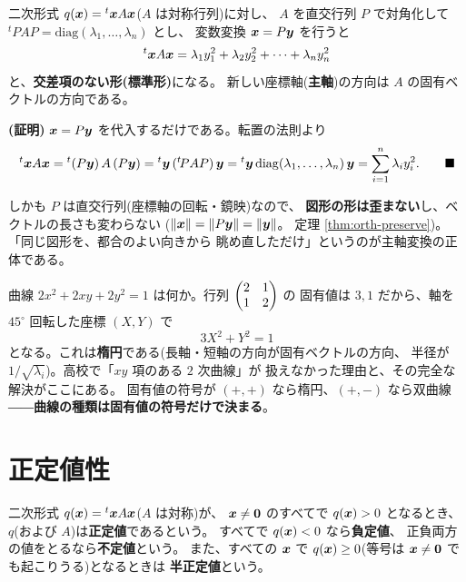 \begin{teiri}\label{thm:quad-std}
二次形式 $q(\bm{x}) = {}^t\bm{x}A\bm{x}$($A$ は対称行列)に対し、
$A$ を直交行列 $P$ で対角化して
${}^t\!PAP = \mathrm{diag}(\lambda_1, \dots, \lambda_n)$ とし、
変数変換 $\bm{x} = P\bm{y}$ を行うと
\[
{}^t\bm{x}A\bm{x}
= \lambda_1 y_1^2 + \lambda_2 y_2^2 + \cdots + \lambda_n y_n^2
\]
と、\textbf{交差項のない形(標準形)}になる。
新しい座標軸(\textbf{主軸})の方向は $A$ の固有ベクトルの方向である。
\end{teiri}

\noindent\textbf{(証明)}\quad
$\bm{x} = P\bm{y}$ を代入するだけである。転置の法則より
\[
{}^t\bm{x}A\bm{x} = {}^t(P\bm{y})\,A\,(P\bm{y})
= {}^t\bm{y}\,({}^t\!PAP)\,\bm{y}
= {}^t\bm{y}\,\mathrm{diag}(\lambda_1, \dots, \lambda_n)\,\bm{y}
= \sum_{i=1}^{n} \lambda_i y_i^2. \qquad\blacksquare
\]

しかも $P$ は直交行列(座標軸の回転・鏡映)なので、
\textbf{図形の形は歪まない}し、ベクトルの長さも変わらない
($\|\bm{x}\| = \|P\bm{y}\| = \|\bm{y}\|$。
定理 \ref{thm:orth-preserve})。「同じ図形を、都合のよい向きから
眺め直しただけ」というのが主軸変換の正体である。

\begin{rei}[二次曲線の分類]\label{rei:quad-conic}
曲線 $2x^2 + 2xy + 2y^2 = 1$ は何か。行列 $\begin{pmatrix}2 & 1 \\ 1 & 2\end{pmatrix}$ の
固有値は $3, 1$ だから、軸を $45^\circ$ 回転した座標 $(X, Y)$ で
\[
3X^2 + Y^2 = 1
\]
となる。これは\textbf{楕円}である(長軸・短軸の方向が固有ベクトルの方向、
半径が $1/\sqrt{\lambda_i}$)。高校で「$xy$ 項のある $2$ 次曲線」が
扱えなかった理由と、その完全な解決がここにある。
固有値の符号が $(+, +)$ なら楕円、$(+, -)$ なら双曲線
――\textbf{曲線の種類は固有値の符号だけで決まる}。
\end{rei}

\section{正定値性}

\begin{teigi}[正定値]\label{def:quad-posdef}
二次形式 $q(\bm{x}) = {}^t\bm{x}A\bm{x}$($A$ は対称)が、
$\bm{x} \neq \bm{0}$ のすべてで $q(\bm{x}) > 0$ となるとき、
$q$(および $A$)は\textbf{正定値}であるという。
すべてで $q(\bm{x}) < 0$ なら\textbf{負定値}、
正負両方の値をとるなら\textbf{不定値}という。
また、すべての $\bm{x}$ で $q(\bm{x}) \ge 0$(等号は
$\bm{x} \neq \bm{0}$ でも起こりうる)となるときは
\textbf{半正定値}という。
\end{teigi}

